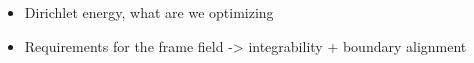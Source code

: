 \documentclass[../thesis.tex]{subfiles}
\begin{document}
\begin{itemize}
  \item Dirichlet energy, what are we optimizing
  \item Requirements for the frame field -> integrability + boundary alignment
\end{itemize}
\end{document}
